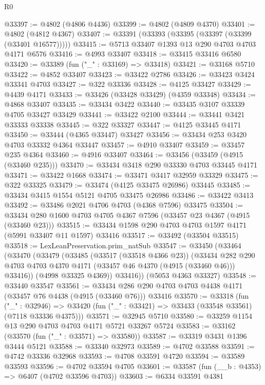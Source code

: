 \begin{lexlean}{R0}
\begin{coremodule}
@33397 := @4802 (@4806 @4436)
@33399 := @4802 (@4809 @4370)
@33401 := @4802 (@4812 @4367)
@33407 := @33391 (@33393 (@33395 (@33397 (@33399 (@33401 @16577)))))
@33415 := @5713 @33407 @1393 @13 @290 @4703 @4703 @4171 @6576
@33416 := @4993 @33407
@33418 := @33415 @33416 @6580
@33420 := @33389 (fun ("_" : @33169) => @33418)
@33421 := @33168 @5710
@33422 := @4852 @33407
@33423 := @33422 @2786
@33426 := @33423 @3424 @33341 @4703
@33427 := @322 @33336
@33428 := @4125 @33427
@33429 := @4439 @4171
@33433 := @33426 (@33428 @33429) (@4359 @33348)
@33434 := @4868 @33407
@33435 := @33434 @3422
@33440 := @33435 @3107 @33339 @4705 @33427 @33429
@33441 := @33422 @2100
@33444 := @33441 @3421 @33333 @33338
@33445 := @322 @33327
@33447 := @4125 @33445 @4171
@33450 := @33444 (@4365 @33447) @33427
@33456 := @33434 @253 @3420 @4703 @33332 @4364 @33447
@33457 := @4910 @33407
@33459 := @33457 @235 @4364
@33460 := @4916 @33407
@33464 := @33456 (@33459 (@4915 (@33460 @235)))
@33470 := @33434 @3418 @290 @33330 @4703 @33445 @4171
@33471 := @33422 @1668
@33474 := @33471 @3417 @32959 @33329
@33475 := @322 @33325
@33479 := @33474 (@4125 @33475 @26986) @33445
@33485 := @33434 @3415 @1554 @5121 @4705 @33475 @26986
@33486 := @33422 @3413
@33492 := @33486 @2021 @4706 @4703 (@4368 @7596) @33475
@33504 := @33434 @280 @1600 @4703 @4705 @4367 @7596 (@33457 @23 @4367 (@4915 (@33460 @23)))
@33515 := @33434 @1598 @290 @4703 @4703 @1597 @4171 (@5991 @33407 @11 @1597) @33416
@33517 := @33492 (@33504 @33515)
@33518 := LexLeanPreservation.prim_natSub
@33547 := @33450
    (@33464
      (@33470
        (@33479
          (@33485
            (@33517 (@33518 @4366 @23))
            (@33434
              @282
              @290
              @4703
              @4703
              @4370
              @4171
              (@33457 @46 @4370 (@4915 (@33460 @46)))
              @33416))
          (@4998 @33325 @4369))
        @33416))
    (@5053 @4363 @33327)
@33548 := @33440 @33547
@33561 := @33434 @286 @290 @4703 @4703 @4438 @4171 (@33457 @76 @4438 (@4915 (@33460 @76))) @33416
@33570 := @33318
    (fun ("_" : @32946) =>
    @33420 (fun ("_" : @33421) => @33433 (@33548 @33561) (@7118 @33336 @4375)))
@33571 := @32945 @5710
@33580 := @33259 @1154 @13 @290 @4703 @4703 @4171 @5721 @33267 @5724
@33583 := @33162 (@33570 (fun ("_" : @33571) => @33580))
@33587 := @33319 @3431 @1396 @3444 @5121
@33588 := @33340 @32973
@33589 := @4702 @33588
@33591 := @4742 @33336 @32968
@33593 := @4708 @33591 @4720
@33594 := @33589 @33593
@33596 := @4702 @33594 @4705
@33601 := @33587 (fun (__b : @4353) => @6407 (@4702 @33596 @4703))
@33603 := @6334 @33591 @4381

\end{coremodule}
\end{lexlean}
